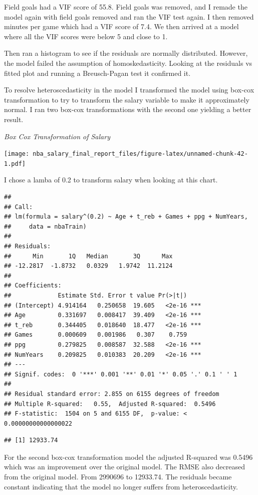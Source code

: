 \documentclass[]{article}
\begin{document}
Field goals had a VIF score of 55.8. Field goals was removed, and I
remade the model again with field goals removed and ran the VIF test
again. I then removed minutes per game which had a VIF score of 7.4. We
then arrived at a model where all the VIF scores were below 5 and close
to 1.

Then ran a histogram to see if the residuals are normally distributed.
However, the model failed the assumption of homoskedasticity. Looking at
the residuals vs fitted plot and running a Breusch-Pagan test it
confirmed it.

To resolve heteroscedasticity in the model I transformed the model using
box-cox transformation to try to transform the salary variable to make
it approximately normal. I ran two box-cox transformations with the
second one yielding a better result.

\emph{Box Cox Transformation of Salary}

\texttt{[image: nba\_salary\_final\_report\_files/figure-latex/unnamed-chunk-42-1.pdf]}

I chose a lamba of 0.2 to transform salary when looking at this chart.

\begin{verbatim}
## 
## Call:
## lm(formula = salary^(0.2) ~ Age + t_reb + Games + ppg + NumYears, 
##     data = nbaTrain)
## 
## Residuals:
##      Min       1Q   Median       3Q      Max 
## -12.2817  -1.8732   0.0329   1.9742  11.2124 
## 
## Coefficients:
##             Estimate Std. Error t value Pr(>|t|)    
## (Intercept) 4.914164   0.250658  19.605   <2e-16 ***
## Age         0.331697   0.008417  39.409   <2e-16 ***
## t_reb       0.344405   0.018640  18.477   <2e-16 ***
## Games       0.000609   0.001986   0.307    0.759    
## ppg         0.279825   0.008587  32.588   <2e-16 ***
## NumYears    0.209825   0.010383  20.209   <2e-16 ***
## ---
## Signif. codes:  0 '***' 0.001 '**' 0.01 '*' 0.05 '.' 0.1 ' ' 1
## 
## Residual standard error: 2.855 on 6155 degrees of freedom
## Multiple R-squared:   0.55,  Adjusted R-squared:  0.5496 
## F-statistic:  1504 on 5 and 6155 DF,  p-value: < 0.00000000000000022
\end{verbatim}

\begin{verbatim}
## [1] 12933.74
\end{verbatim}

For the second box-cox transformation model the adjusted R-squared was
0.5496 which was an improvement over the original model. The RMSE also
decreased from the original model. From 2990696 to 12933.74. The
residuals became constant indicating that the model no longer suffers
from heteroscedasticity.
\end{document}
